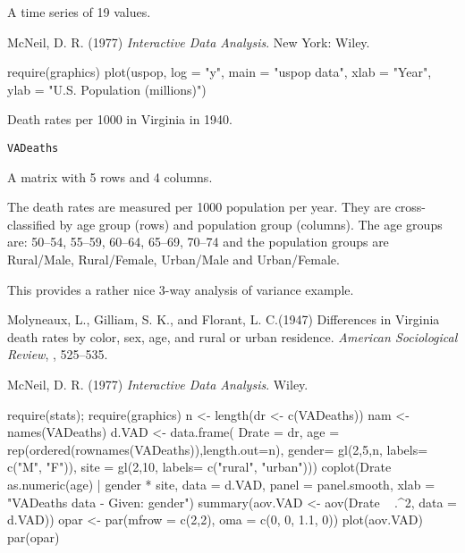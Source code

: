 %
\begin{Format}
A time series of 19 values.
\end{Format}
%
\begin{Source}\relax
McNeil, D. R. (1977)
\emph{Interactive Data Analysis}.
New York: Wiley.
\end{Source}
%
\begin{Examples}
\begin{ExampleCode}
require(graphics)
plot(uspop, log = "y", main = "uspop data", xlab = "Year",
     ylab = "U.S. Population (millions)")
\end{ExampleCode}
\end{Examples}
%
\begin{Description}\relax
Death rates per 1000 in Virginia in 1940.
\end{Description}
%
\begin{Usage}
\begin{verbatim}
VADeaths
\end{verbatim}
\end{Usage}
%
\begin{Format}
A matrix with 5 rows and 4 columns.
\end{Format}
%
\begin{Details}\relax
The death rates are measured per 1000 population per year.  They
are cross-classified by age group (rows) and
population group (columns).  The age groups are: 50--54, 55--59,
60--64, 65--69, 70--74 and the population groups are Rural/Male,
Rural/Female, Urban/Male and Urban/Female.

This provides a rather nice 3-way analysis of variance example.
\end{Details}
%
\begin{Source}\relax
Molyneaux, L.,  Gilliam, S. K., and  Florant, L. C.(1947)
Differences in Virginia death rates by color, sex, age,
and rural or urban residence.
\emph{American Sociological Review}, , 525--535.
\end{Source}
%
\begin{References}\relax
McNeil, D. R. (1977)
\emph{Interactive Data Analysis}.
Wiley.
\end{References}
%
\begin{Examples}
\begin{ExampleCode}
require(stats); require(graphics)
n <- length(dr <- c(VADeaths))
nam <- names(VADeaths)
d.VAD <- data.frame(
 Drate = dr,
 age = rep(ordered(rownames(VADeaths)),length.out=n),
 gender= gl(2,5,n, labels= c("M", "F")),
 site =  gl(2,10,  labels= c("rural", "urban")))
coplot(Drate ~ as.numeric(age) | gender * site, data = d.VAD,
       panel = panel.smooth, xlab = "VADeaths data - Given: gender")
summary(aov.VAD <- aov(Drate ~ .^2, data = d.VAD))
opar <- par(mfrow = c(2,2), oma = c(0, 0, 1.1, 0))
plot(aov.VAD)
par(opar)
\end{ExampleCode}
\end{Examples}
